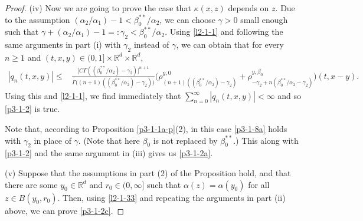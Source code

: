 \documentclass[a4paper,11pt]{amsart}
\renewcommand{\le}{\leqslant}
\renewcommand{\ge}{\geqslant}
\newcommand{\R}{\mathds R}
\newcommand{\B}{\beta}
\newcommand{\A}{\alpha}
\newcommand{\G}{\gamma}
\theoremstyle{definition}
\begin{document}
\begin{proof}
(iv) Now we are going to prove the case that $\kappa(x,z)$ depends on $z$.
Due to the assumption $({\A_2}/{\A_1})-1<{\B_0^{**}}/{\A_2}$, we can choose $\gamma>0$ small enough such that
$\gamma+({\A_2}/{\A_1})-1=:\G_2 <{\B_0^{**}}/{\A_2}$. Using \eqref{l2-1-1} and following the same arguments in part (i) with $\G_2 $ instead of $\G$, we can obtain that for
every $n\ge 1$ and $(t,x,y)\in (0,1]\times \R^d \times \R^d$,
\begin{equation}\label{p3-1-9a}
\begin{split}
|q_n(t,x,y)|\le &\frac{\big[C \Gamma(({\beta_0^{**}}/{\A_2})-\G_2  )\big]^{n+1}}{\Gamma\big((n+1)(({\beta_0^{**}}/{\A_2})-\G_2 )\big)} \bigg(\rho_{(n+1)(({\B_0^{**}}/{\A_2})-\G_2 )}^{y,0}+\rho_{-\G_2 +n({\B_0^{**}}/{\A_2}
-\G_2 )}^{y,\B_0} \bigg)(t,x-y).
\end{split}
\end{equation}
Using this and \eqref{l2-1-1}, we find immediately that $\sum_{n=0}^{\infty}|q_n(t,x,y)|<\infty$ and so
\eqref{p3-1-2} is true.

Note that, according to Proposition \ref{p3-1-1a-p}(2), in this case \eqref{p3-1-8a} holds with
$\gamma_2$ in place of  $\G $. (Note that here $\B_0$ is not replaced by $\B_0^{**}$.) This along with \eqref{p3-1-2} and the same argument in (iii) gives us \eqref{p3-1-2a}.


(v) Suppose that the assumptions in part (2) of the Proposition hold, and that there are some $y_0\in \R^d$ and $r_0\in(0,\infty]$ such that $\alpha(z)=\alpha(y_0)$ for all $z \in B(y_0,r_0)$. Then, using \eqref{l2-1-33} and repeating the arguments in part (ii) above,
we can prove \eqref{p3-1-2c}.
\end{proof}
\end{document}
